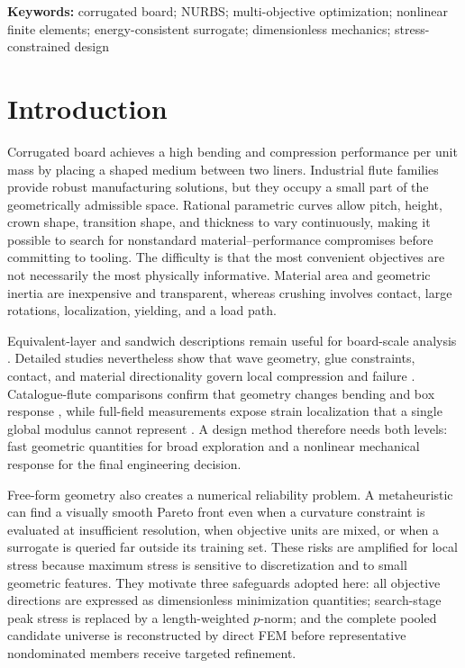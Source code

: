 \documentclass[11pt]{article}
\begin{document}
\noindent\textbf{Keywords:} corrugated board; NURBS; multi-objective optimization; nonlinear finite elements; energy-consistent surrogate; dimensionless mechanics; stress-constrained design

\section{Introduction}

Corrugated board achieves a high bending and compression performance per unit mass by placing a shaped medium between two liners. Industrial flute families provide robust manufacturing solutions, but they occupy a small part of the geometrically admissible space. Rational parametric curves allow pitch, height, crown shape, transition shape, and thickness to vary continuously, making it possible to search for nonstandard material--performance compromises before committing to tooling. The difficulty is that the most convenient objectives are not necessarily the most physically informative. Material area and geometric inertia are inexpensive and transparent, whereas crushing involves contact, large rotations, localization, yielding, and a load path.

Equivalent-layer and sandwich descriptions remain useful for board-scale analysis \citep{Aboura2004,Buannic2003,Biancolini2005,Talbi2009,Garbowski2021Shear}. Detailed studies nevertheless show that wave geometry, glue constraints, contact, and material directionality govern local compression and failure \citep{Lu2001,HajAli2009,Park2020Edge,Park2021Flat}. Catalogue-flute comparisons confirm that geometry changes bending and box response \citep{DiRusso2023}, while full-field measurements expose strain localization that a single global modulus cannot represent \citep{Viguie2011,Viguie2013,Fadiji2020}. A design method therefore needs both levels: fast geometric quantities for broad exploration and a nonlinear mechanical response for the final engineering decision.

Free-form geometry also creates a numerical reliability problem. A metaheuristic can find a visually smooth Pareto front even when a curvature constraint is evaluated at insufficient resolution, when objective units are mixed, or when a surrogate is queried far outside its training set. These risks are amplified for local stress because maximum stress is sensitive to discretization and to small geometric features. They motivate three safeguards adopted here: all objective directions are expressed as dimensionless minimization quantities; search-stage peak stress is replaced by a length-weighted $p$-norm; and the complete pooled candidate universe is reconstructed by direct FEM before representative nondominated members receive targeted refinement.
\end{document}
